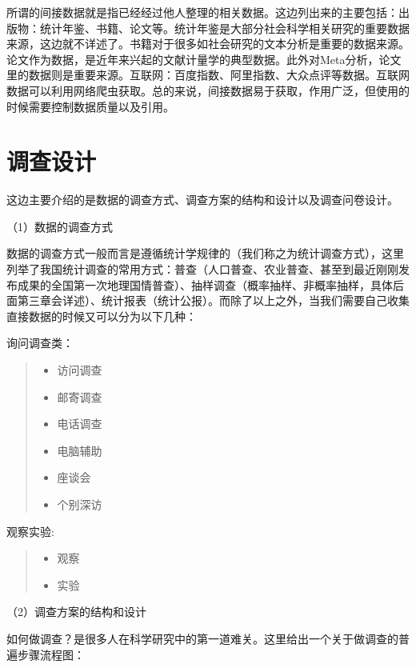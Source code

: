 \documentclass[]{ctexbook}
\providecommand{\tightlist}{%
  \setlength{\itemsep}{0pt}\setlength{\parskip}{0pt}}
\begin{document}
所谓的间接数据就是指已经经过他人整理的相关数据。这边列出来的主要包括：出版物：统计年鉴、书籍、论文等。统计年鉴是大部分社会科学相关研究的重要数据来源，这边就不详述了。书籍对于很多如社会研究的文本分析是重要的数据来源。论文作为数据，是近年来兴起的文献计量学的典型数据。此外对Meta分析，论文里的数据则是重要来源。互联网：百度指数、阿里指数、大众点评等数据。互联网数据可以利用网络爬虫获取。总的来说，间接数据易于获取，作用广泛，但使用的时候需要控制数据质量以及引用。

\hypertarget{ux8c03ux67e5ux8bbeux8ba1}{%
\section{调查设计}\label{ux8c03ux67e5ux8bbeux8ba1}}

这边主要介绍的是数据的调查方式、调查方案的结构和设计以及调查问卷设计。

（1）数据的调查方式

数据的调查方式一般而言是遵循统计学规律的（我们称之为统计调查方式），这里列举了我国统计调查的常用方式：普查（人口普查、农业普查、甚至到最近刚刚发布成果的全国第一次地理国情普查）、抽样调查（概率抽样、非概率抽样，具体后面第三章会详述）、统计报表（统计公报）。而除了以上之外，当我们需要自己收集直接数据的时候又可以分为以下几种：

询问调查类：

\begin{quote}
\begin{itemize}
\tightlist
\item
  访问调查
\item
  邮寄调查
\item
  电话调查
\item
  电脑辅助
\item
  座谈会
\item
  个别深访
\end{itemize}
\end{quote}

观察实验:

\begin{quote}
\begin{itemize}
\tightlist
\item
  观察
\item
  实验
\end{itemize}
\end{quote}

（2）调查方案的结构和设计

如何做调查？是很多人在科学研究中的第一道难关。这里给出一个关于做调查的普遍步骤流程图：
\end{document}
